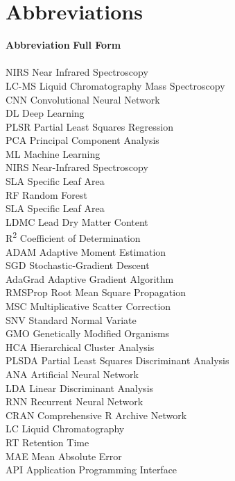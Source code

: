 \documentclass[12pt,a4paper]{report}
\begin{document}
\newpage
\tableofcontents

\newpage
\section*{Abbreviations}
\begin{tabbing}
    \textbf{Abbreviation} \hspace{2cm} \= \textbf{Full Form} \\
    \\
    NIRS \> Near Infrared Spectroscopy \\
    LC-MS \> Liquid Chromatography Mass Spectroscopy \\
    CNN \> Convolutional Neural Network \\
    DL \> Deep Learning \\
    PLSR \> Partial Least Squares Regression \\
    PCA \> Principal Component Analysis \\
    ML \> Machine Learning \\
    NIRS \> Near-Infrared Spectroscopy \\
    SLA \> Specific Leaf Area \\
    RF \> Random Forest \\
    SLA \> Specific Leaf Area \\
    LDMC \> Lead Dry Matter Content \\
    R\textsuperscript{2} \> Coefficient of Determination \\
    ADAM \> Adaptive Moment Estimation \\
    SGD \> Stochastic-Gradient Descent \\
    AdaGrad \> Adaptive Gradient Algorithm \\
    RMSProp \> Root Mean Square Propagation \\
    MSC \> Multiplicative Scatter Correction \\
    SNV \> Standard Normal Variate \\
    GMO \> Genetically Modified Organisms \\
    HCA \> Hierarchical Cluster Analysis \\
    PLSDA  \> Partial Least Squares Discriminant Analysis \\
    ANA \>  Artificial Neural Network \\
    LDA \> Linear Discriminant Analysis \\
    RNN \> Recurrent Neural Network \\
    CRAN \> Comprehensive R Archive Network \\
    LC \> Liquid Chromatography \\
    RT \> Retention Time \\
    MAE \> Mean Absolute Error \\
    API \> Application Programming Interface \\
    
\end{tabbing}
\end{document}
